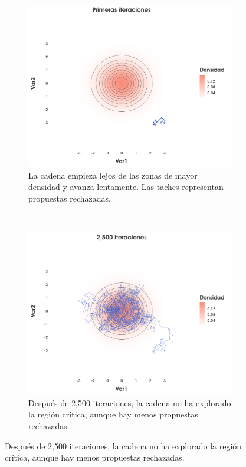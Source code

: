 \begin{figure}[h]
    \centering
    \begin{subfigure}{0.3\textwidth}
        \includegraphics[width=\textwidth]{Figs/Bayes/Ejemplo2_RWM_A}
        \caption{La cadena empieza lejos de las zonas de mayor densidad y avanza lentamente. Las taches representan propuestas rechazadas.}
    \end{subfigure}
    ~ 
    \begin{subfigure}{0.3\textwidth}
        \includegraphics[width=\textwidth]{Figs/Bayes/Ejemplo2_RWM_B}
        \caption{Después de 2,500 iteraciones, la cadena no ha explorado la región crítica, aunque hay menos propuestas rechazadas.}

\end{subfigure}
\end{figure}
